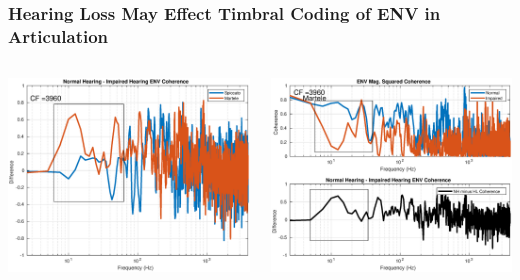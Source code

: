 \documentclass[aspectratio=1610]{beamer}
\begin{document}
\begin{frame}
\frametitle{Hearing Loss May Effect Timbral Coding of ENV in Articulation} 

\begin{columns}
\begin{column}{0.55\textwidth}
\includegraphics[scale = .4]{martele_spiccato_ENV_3960}
\end{column}
\begin{column}{0.56\textwidth}
\includegraphics[scale = .4]{martele_ENV_diff}
\end{column}
\end{columns}

\end{frame}
\end{document}
